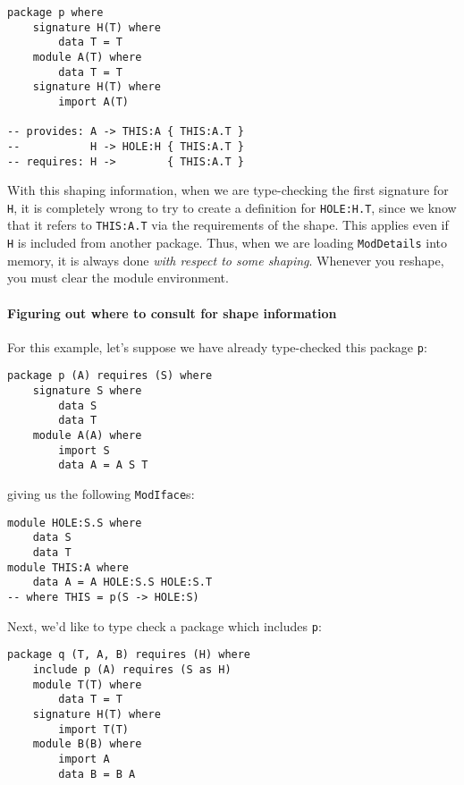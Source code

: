 \documentclass{article}
\begin{document}
\begin{verbatim}
package p where
    signature H(T) where
        data T = T
    module A(T) where
        data T = T
    signature H(T) where
        import A(T)

-- provides: A -> THIS:A { THIS:A.T }
--           H -> HOLE:H { THIS:A.T }
-- requires: H ->        { THIS:A.T }
\end{verbatim}

With this shaping information, when we are type-checking the first
signature for \verb|H|, it is completely wrong to try to create
a definition for \verb|HOLE:H.T|, since we know that it refers
to \verb|THIS:A.T| via the requirements of the shape.  This applies
even if \verb|H| is included from another package.  Thus, when
we are loading \verb|ModDetails| into memory, it is always done
\emph{with respect to some shaping}.  Whenever you reshape,
you must clear the module environment.

\paragraph{Figuring out where to consult for shape information}

For this example, let's suppose we have already type-checked
this package \verb|p|:

\begin{verbatim}
package p (A) requires (S) where
    signature S where
        data S
        data T
    module A(A) where
        import S
        data A = A S T
\end{verbatim}

giving us the following \verb|ModIface|s:

\begin{verbatim}
module HOLE:S.S where
    data S
    data T
module THIS:A where
    data A = A HOLE:S.S HOLE:S.T
-- where THIS = p(S -> HOLE:S)
\end{verbatim}

Next, we'd like to type check a package which includes \verb|p|:

\begin{verbatim}
package q (T, A, B) requires (H) where
    include p (A) requires (S as H)
    module T(T) where
        data T = T
    signature H(T) where
        import T(T)
    module B(B) where
        import A
        data B = B A
\end{verbatim}

\end{document}

